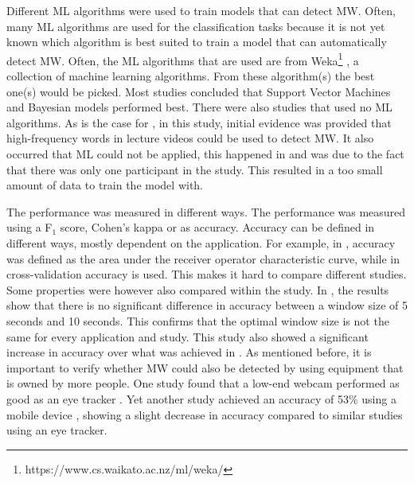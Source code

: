 Different ML algorithms were used to train models that can detect MW. Often, many ML algorithms are used for the classification tasks because it is not yet known which algorithm is best suited to train a model that can automatically detect MW. Often, the ML algorithms that are used are from Weka\footnote{https://www.cs.waikato.ac.nz/ml/weka/} \cite{Bixler2015AutomaticPhysiology}\cite{Bixler2015AutomaticAwareness}\cite{Bixler2016AutomaticReadingd}\cite{Bixler2014TowardWanderingd}\cite{Blanchard2014AutomatedLearning}\cite{Gwizdka2019ExploringTasks}\cite{Hutt2017OutClassroom}\cite{Pham2015Attentivelearner:Tracking}, a collection of machine learning algorithms. From these algorithm(s) the best one(s) would be picked. Most studies concluded that Support Vector Machines and Bayesian models performed best. There were also studies that used no ML algorithms. As is the case for \cite{Jo2017AMind}, in this study, initial evidence was provided that high-frequency words in lecture videos could be used to detect MW. It also occurred that ML could not be applied, this happened in \cite{Gontier2016HowEnvironment} and was due to the fact that there was only one participant in the study. This resulted in a too small amount of data to train the model with.

The performance was measured in different ways. The performance was measured using a F$_1$ score, Cohen's kappa or as accuracy. Accuracy can be defined in different ways, mostly dependent on the application. For example, in \cite{Cheetham2016AutomatedApplication}, accuracy was defined as the area under the receiver operator characteristic curve, while in \cite{Mishchenko2015DetectingTespiti} cross-validation accuracy is used. This makes it hard to compare different studies. Some properties were however also compared within the study. In \cite{Gwizdka2019ExploringTasks}, the results show that there is no significant difference in accuracy between a window size of 5 seconds and 10 seconds. This confirms that the optimal window size is not the same for every application and study. This study also showed a significant increase in accuracy over what was achieved in \cite{Bixler2014TowardWanderingd}. As mentioned before, it is important to verify whether MW could also be detected by using equipment that is owned by more people. One study found that a low-end webcam performed as good as an eye tracker \cite{Zhao2017ScalableApproach}. Yet another study achieved an accuracy of 53\% using a mobile device \cite{ISI:000443429900018}, showing a slight decrease in accuracy compared to similar studies using an eye tracker.